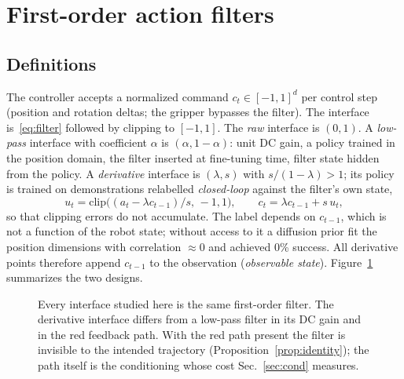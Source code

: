 \documentclass{article}
\begin{document}
\section{First-order action filters}
\label{sec:theory}

\subsection{Definitions}

The controller accepts a normalized command $c_t\in[-1,1]^d$ per control step (position and rotation deltas; the gripper bypasses the filter). The interface is~\eqref{eq:filter} followed by clipping to $[-1,1]$. The \emph{raw} interface is $(0,1)$. A \emph{low-pass} interface with coefficient $\alpha$ is $(\alpha,1-\alpha)$: unit DC gain, a policy trained in the position domain, the filter inserted at fine-tuning time, filter state hidden from the policy. A \emph{derivative} interface is $(\lambda,s)$ with $s/(1-\lambda)>1$; its policy is trained on demonstrations relabelled \emph{closed-loop} against the filter's own state,
\begin{equation}
u_t=\mathrm{clip}\!\big((a_t-\lambda c_{t-1})/s,\,-1,1\big),\qquad c_t=\lambda c_{t-1}+s\,u_t,
\label{eq:relabel}
\end{equation}
so that clipping errors do not accumulate. The label depends on $c_{t-1}$, which is not a function of the robot state; without access to it a diffusion prior fit the position dimensions with correlation $\approx0$ and achieved 0\% success. All derivative points therefore append $c_{t-1}$ to the observation (\emph{observable state}). Figure~\ref{fig:schematic} summarizes the two designs.

\begin{figure}[t]
\centering
{}
\caption{Every interface studied here is the same first-order filter. The derivative interface differs from a low-pass filter in its DC gain and in the red feedback path. With the red path present the filter is invisible to the intended trajectory (Proposition~\ref{prop:identity}); the path itself is the conditioning whose cost Sec.~\ref{sec:cond} measures.}
\label{fig:schematic}
\end{figure}
\end{document}
